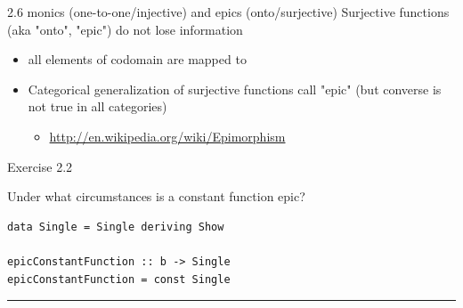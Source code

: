 \documentclass[presentation]{beamer}
\begin{document}
\begin{frame}[fragile,label=sec-5]{2.6 monics (one-to-one/injective) and epics (onto/surjective)}
Surjective functions (aka "onto", "epic") do not lose information
\begin{itemize}
\item all elements of codomain are mapped to
\item Categorical generalization of surjective functions call "epic" (but converse is not true in all categories)
\begin{itemize}
\item \url{http://en.wikipedia.org/wiki/Epimorphism}
\end{itemize}
\end{itemize}

\alert{Exercise 2.2}

Under what circumstances is a constant function epic?

\begin{verbatim}
data Single = Single deriving Show

epicConstantFunction :: b -> Single
epicConstantFunction = const Single
\end{verbatim}

\rule{\linewidth}{0.5pt}
\end{frame}
\end{document}
